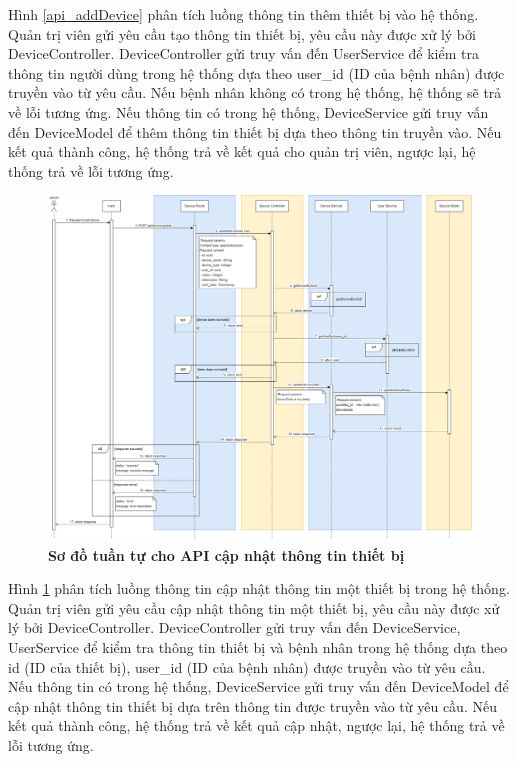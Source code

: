 Hình \ref{api_addDevice} phân tích luồng thông tin thêm thiết bị vào hệ thống. Quản trị viên gửi yêu cầu tạo thông tin thiết bị, 
yêu cầu này được xử lý bởi DeviceController. DeviceController gửi truy vấn đến UserService để kiểm tra thông tin người dùng trong hệ thống dựa theo user\_id (ID của bệnh nhân) được truyền vào từ yêu cầu. 
Nếu bệnh nhân không có trong hệ thống, hệ thống sẽ trả về lỗi tương ứng. Nếu thông tin có trong hệ thống, DeviceService gửi truy vấn đến DeviceModel để thêm thông tin thiết bị 
dựa theo thông tin truyền vào. Nếu kết quả thành công, hệ thống trả về kết quả cho quản trị viên, ngược lại, hệ thống trả về lỗi tương ứng.

\begin{figure}[H]
  \centering
  \includegraphics[scale=0.3]{Images/sequence_api/editDevice.png}
  \caption[Sơ đồ tuần tự cho API cập nhật thông tin thiết bị ]{\bfseries \fontsize{12pt}{0pt}
  \selectfont Sơ đồ tuần tự cho API cập nhật thông tin thiết bị }
  \label{api_editDevice} %
\end{figure}
Hình \ref{api_editDevice} phân tích luồng thông tin cập nhật thông tin một thiết bị trong hệ thống. Quản trị viên gửi yêu cầu cập nhật thông tin một thiết bị, 
yêu cầu này được xử lý bởi DeviceController. DeviceController gửi truy vấn đến DeviceService, UserService để kiểm tra thông tin thiết bị và bệnh nhân trong hệ thống dựa theo id (ID của thiết bị),
 user\_id (ID của bệnh nhân) được truyền vào từ yêu cầu. Nếu thông tin có trong hệ thống, 
 DeviceService gửi truy vấn đến DeviceModel để cập nhật thông tin thiết bị dựa trên thông tin được truyền vào từ yêu cầu. Nếu kết quả thành công, hệ thống trả về kết quả cập nhật, ngược lại, hệ thống trả về lỗi tương ứng.

